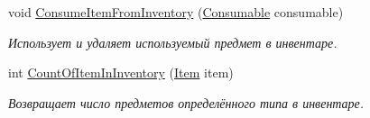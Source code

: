 \begin{DoxyCompactItemize}
void \hyperlink{class_a_s_c_i_i_wars_1_1_game_1_1_player_ac1b40c126e1d9ec4f45f7831a86497ba}{Consume\+Item\+From\+Inventory} (\hyperlink{class_a_s_c_i_i_wars_1_1_game_1_1_consumable}{Consumable} consumable)
\begin{DoxyCompactList}\small\item\em Использует и удаляет используемый предмет в инвентаре. \end{DoxyCompactList}\item 
int \hyperlink{class_a_s_c_i_i_wars_1_1_game_1_1_player_acb07b9e02dfe26cae85c1b685517438b}{Count\+Of\+Item\+In\+Inventory} (\hyperlink{class_a_s_c_i_i_wars_1_1_game_1_1_item}{Item} item)
\begin{DoxyCompactList}\small\item\em Возвращает число предметов определённого типа в инвентаре. \end{DoxyCompactList}\end{DoxyCompactItemize}
